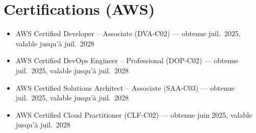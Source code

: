 \section*{Certifications (AWS)}

\begin{itemize}
  \item AWS Certified Developer -- Associate (DVA-C02) --- obtenue juil.\ 2025, valable jusqu'\`a juil.\ 2028
  \item AWS Certified DevOps Engineer -- Professional (DOP-C02) --- obtenue juil.\ 2025, valable jusqu'\`a juil.\ 2028
  \item AWS Certified Solutions Architect -- Associate (SAA-C03) --- obtenue juil.\ 2025, valable jusqu'\`a juil.\ 2028
  \item AWS Certified Cloud Practitioner (CLF-C02) --- obtenue juin 2025, valable jusqu'\`a juil.\ 2028
\end{itemize}
